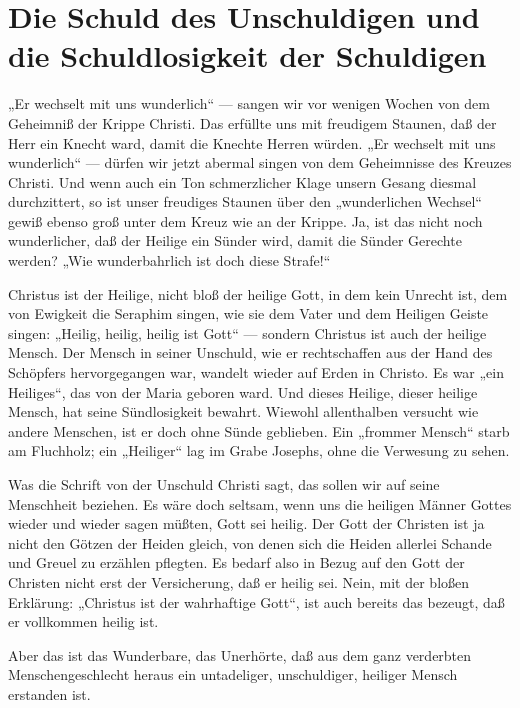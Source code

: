 \chapter[Die Schuld des Unschuldigen]{Die Schuld des Unschuldigen und die Schuldlosigkeit der Schuldigen}

„Er wechselt mit uns wunderlich“ — sangen wir vor wenigen Wochen von dem Geheimniß der Krippe Christi. Das erfüllte uns mit freudigem Staunen, daß der Herr ein Knecht ward, damit die Knechte Herren würden. „Er wechselt mit uns wunderlich“ — dürfen wir jetzt abermal singen von dem Geheimnisse des Kreuzes Christi. Und wenn auch ein Ton schmerzlicher Klage unsern Gesang diesmal durchzittert, so ist unser freudiges Staunen über den „wunderlichen Wechsel“ gewiß ebenso groß unter dem Kreuz wie an der Krippe. Ja, ist das nicht noch wunderlicher, daß der Heilige ein Sünder wird, damit die Sünder Gerechte werden? „Wie wunderbahrlich ist doch diese Strafe!“

Christus ist der Heilige, nicht bloß der heilige Gott, in dem kein Unrecht ist, dem von Ewigkeit die Seraphim singen, wie sie dem Vater und dem Heiligen Geiste singen: „Heilig, heilig, heilig ist Gott“ — sondern Christus ist auch der heilige Mensch. Der Mensch in seiner Unschuld, wie er rechtschaffen aus der Hand des Schöpfers hervorgegangen war, wandelt wieder auf Erden in Christo. Es war „ein Heiliges“, das von der Maria geboren ward. Und dieses Heilige, dieser heilige Mensch, hat seine Sündlosigkeit bewahrt. Wiewohl allenthalben versucht wie andere Menschen, ist er doch ohne Sünde geblieben. Ein „frommer Mensch“ starb am Fluchholz; ein „Heiliger“ lag im Grabe Josephs, ohne die Verwesung zu sehen.

Was die Schrift von der Unschuld Christi sagt, das sollen wir auf seine Menschheit beziehen. Es wäre doch seltsam, wenn uns die heiligen Männer Gottes wieder und wieder sagen müßten, Gott sei heilig. Der Gott der Christen ist ja nicht den Götzen der Heiden gleich, von denen sich die Heiden allerlei Schande und Greuel zu erzählen pflegten. Es bedarf also in Bezug auf den Gott der Christen nicht erst der Versicherung, daß er heilig sei. Nein, mit der bloßen Erklärung: „Christus ist der wahrhaftige Gott“, ist auch bereits das bezeugt, daß er vollkommen heilig ist.

Aber das ist das Wunderbare, das Unerhörte, daß aus dem ganz verderbten Menschengeschlecht heraus ein untadeliger, unschuldiger, heiliger Mensch erstanden ist.

